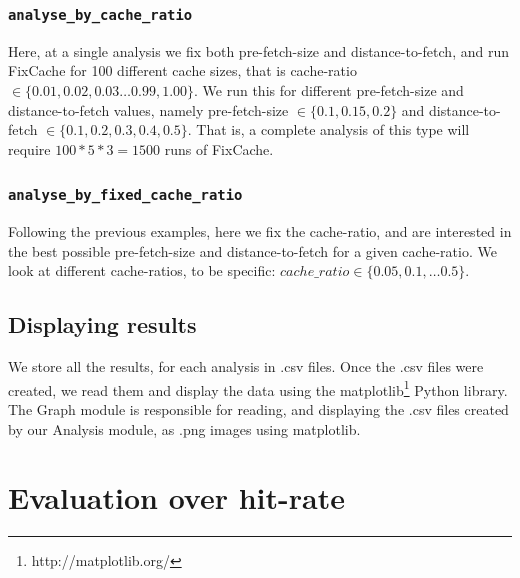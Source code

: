 \documentclass[12pt,twoside,notitlepage]{report}
\newcommand{\fxch}{FixCache}
\begin{document}
\subsubsection{\texttt{analyse\_by\_cache\_ratio}}Here, at a single analysis we fix both pre-fetch-size and distance-to-fetch, and run \fxch{} for 100 different cache sizes, that is cache-ratio $\in \{0.01, 0.02, 0.03 \dots 0.99, 1.00\}$. We run this for different pre-fetch-size and distance-to-fetch values, namely pre-fetch-size $\in \{0.1, 0.15, 0.2\}$ and distance-to-fetch $\in \{0.1, 0.2, 0.3, 0.4, 0.5\}$. That is, a complete analysis of this type will require $100*5*3=1500$ runs of \fxch{}.
\subsubsection{\texttt{analyse\_by\_fixed\_cache\_ratio}} 
Following the previous examples, here we fix the cache-ratio, and are interested in the best possible pre-fetch-size and distance-to-fetch for a given cache-ratio. We look at different cache-ratios, to be specific: $cache\_ratio \in \{0.05, 0.1, \dots 0.5\}$. 
\subsection{Displaying results}
We store all the results, for each analysis in .csv files. Once the .csv files were created, we read them and display the data using the matplotlib\footnote{http://matplotlib.org/} Python library. The Graph module is responsible for reading, and displaying the .csv files created by our Analysis module, as .png images using matplotlib.
\section{Evaluation over hit-rate}
\end{document}
